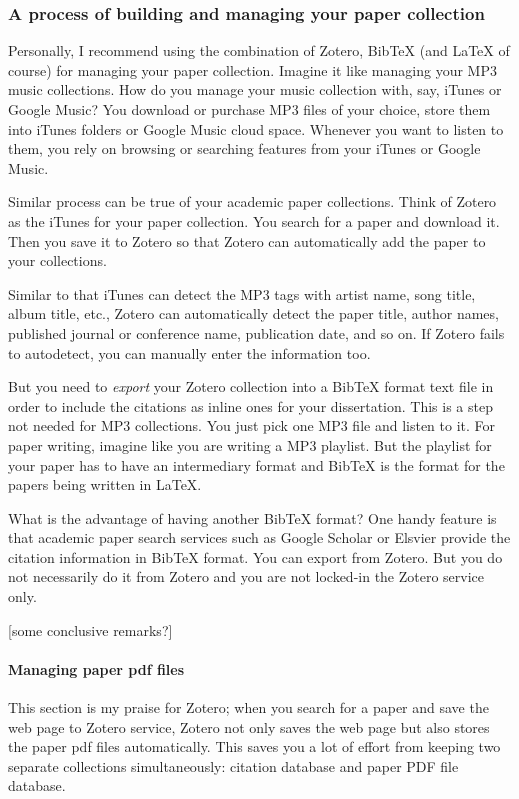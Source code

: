\documentclass[11pt]{article}
\begin{document}
\subsubsection{A process of building and managing your paper collection}
Personally, I recommend using the combination of Zotero, BibTeX (and LaTeX of
course) for managing your paper collection. Imagine it like managing your MP3
music collections. How do you manage your music collection with, say, iTunes
or Google Music? You download or purchase MP3 files of your choice, store them
into iTunes folders or Google Music cloud space. Whenever you want to listen
to them, you rely on browsing or searching features from your iTunes or Google
Music.

Similar process can be true of your academic paper collections. Think of
Zotero as the iTunes for your paper collection. You search for a paper and
download it. Then you save it to Zotero so that Zotero can automatically add
the paper to your collections. 

Similar to that iTunes can detect the MP3 tags with artist name, song title,
album title, etc., Zotero can automatically detect the paper title, author
names, published journal or conference name, publication date, and so on. If
Zotero fails to autodetect, you can manually enter the information too.

But you need to \emph{export} your Zotero collection into a BibTeX format
text file in order to include the citations as inline ones for your
dissertation. This is a step not needed for MP3 collections. You just pick one
MP3 file and listen to it. For paper writing, imagine like you are writing a
MP3 playlist. But the playlist for your paper has to have an intermediary
format and BibTeX is the format for the papers being written in LaTeX.

What is the advantage of having another BibTeX format? One handy feature is
that academic paper search services such as Google Scholar or Elsvier provide
the citation information in BibTeX format. You can export from Zotero. But you
do not necessarily do it from Zotero and you are not locked-in the Zotero
service only. 

[some conclusive remarks?]

\paragraph{Managing paper pdf files}
This section is my praise for Zotero; when you search for a paper and
save the web page to Zotero service, Zotero not only saves the web page
but also stores the paper pdf files automatically. This saves you a lot
of effort from keeping two separate collections simultaneously: citation
database and paper PDF file database.
\end{document}
